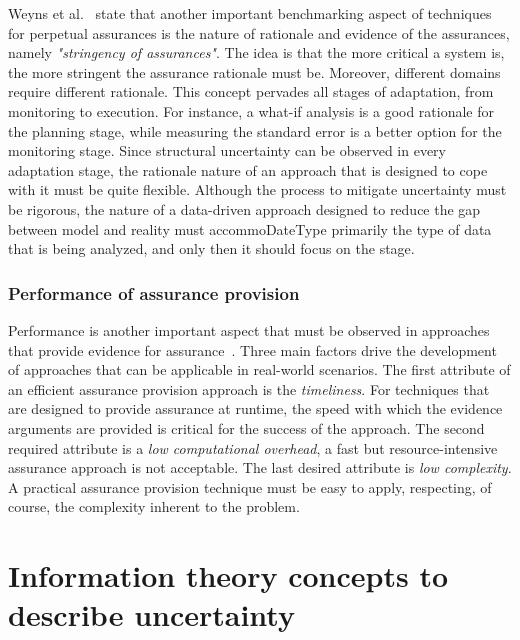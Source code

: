 Weyns et al.~\cite{Weyns2016PerpetualAF} state that another important benchmarking aspect of techniques for perpetual assurances is the nature of rationale and evidence of the assurances, namely \textit{"stringency of assurances"}. The idea is that the more critical a system is, the more stringent the assurance rationale must be. Moreover, different domains require different rationale. This concept pervades all stages of adaptation, from monitoring to execution. For instance, a what-if analysis is a good rationale for the planning stage, while measuring the standard error is a better option for the monitoring stage. Since structural uncertainty can be observed in every adaptation stage, the rationale nature of an approach that is designed to cope with it must be quite flexible. Although the process to mitigate uncertainty must be rigorous, the nature of a data-driven approach designed to reduce the gap  between model and reality must accommoDateType primarily the type of data that is being analyzed, and only then it should focus on the stage.

\subsubsection{Performance of assurance provision}

Performance is another important aspect that must be observed in approaches that provide evidence for assurance~\cite{Weyns2016PerpetualAF}. Three main factors drive the development of approaches that can be applicable in real-world scenarios. The first attribute of an efficient assurance provision approach is the \textit{timeliness}. For techniques that are designed to provide assurance at runtime, the speed with which the evidence arguments are provided is critical for the success of the approach. The second required attribute is a \textit{low computational overhead}, a fast but resource-intensive assurance approach is not acceptable. The last desired attribute is \textit{low complexity}. A practical assurance provision technique must be easy to apply, respecting, of course, the complexity inherent to the problem.



\section{Information theory concepts to describe uncertainty}\label{sec:Dep}

